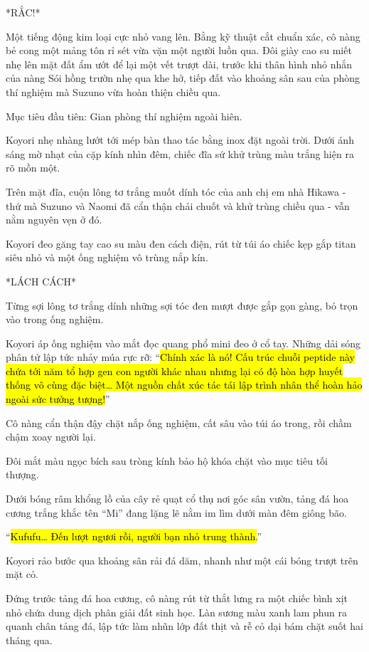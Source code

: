 \documentclass[../main.tex]{subfiles}
\begin{document}
*RẮC!*

Một tiếng động kim loại cực nhỏ vang lên. Bằng kỹ thuật cắt chuẩn xác, cô nàng bẻ cong một mảng tôn rỉ sét vừa vặn một người luồn qua. Đôi giày cao su miết nhẹ lên mặt đất ẩm ướt để lại một vết trượt dài, trước khi thân hình nhỏ nhắn của nàng Sói hồng trườn nhẹ qua khe hở, tiếp đất vào khoảng sân sau của phòng thí nghiệm mà Suzuno vừa hoàn thiện chiều qua.

Mục tiêu đầu tiên: Gian phòng thí nghiệm ngoài hiên.

Koyori nhẹ nhàng lướt tới mép bàn thao tác bằng inox đặt ngoài trời. Dưới ánh sáng mờ nhạt của cặp kính nhìn đêm, chiếc đĩa sứ khử trùng màu trắng hiện ra rõ mồn một.

Trên mặt đĩa, cuộn lông tơ trắng muốt dính tóc của anh chị em nhà Hikawa - thứ mà Suzuno và Naomi đã cẩn thận chải chuốt và khử trùng chiều qua - vẫn nằm nguyên vẹn ở đó.

Koyori đeo găng tay cao su màu đen cách điện, rút từ túi áo chiếc kẹp gắp titan siêu nhỏ và một ống nghiệm vô trùng nắp kín.

*LÁCH CÁCH*

Từng sợi lông tơ trắng dính những sợi tóc đen mượt được gắp gọn gàng, bỏ trọn vào trong ống nghiệm.

Koyori áp ống nghiệm vào mắt đọc quang phổ mini đeo ở cổ tay. Những dải sóng phân tử lập tức nhảy múa rực rỡ: ``\hl{Chính xác là nó! Cấu trúc chuỗi peptide này chứa tới năm tổ hợp gen con người khác nhau nhưng lại có độ hòa hợp huyết thống vô cùng đặc biệt\dots{} Một nguồn chất xúc tác tái lập trình nhân thể hoàn hảo ngoài sức tưởng tượng!}''

Cô nàng cẩn thận đậy chặt nắp ống nghiệm, cất sâu vào túi áo trong, rồi chầm chậm xoay người lại.

Đôi mắt màu ngọc bích sau tròng kính bảo hộ khóa chặt vào mục tiêu tối thượng.

Dưới bóng râm khổng lồ của cây rẻ quạt cổ thụ nơi góc sân vườn, tảng đá hoa cương trắng khắc tên ``Mi'' đang lặng lẽ nằm im lìm dưới màn đêm giông bão.

``\hl{Kufufu\dots{} Đến lượt ngươi rồi, người bạn nhỏ trung thành.}''

Koyori rảo bước qua khoảng sân rải đá dăm, nhanh như một cái bóng trượt trên mặt cỏ.

Đứng trước tảng đá hoa cương, cô nàng rút từ thắt lưng ra một chiếc bình xịt nhỏ chứa dung dịch phân giải đất sinh học. Làn sương màu xanh lam phun ra quanh chân tảng đá, lập tức làm nhũn lớp đất thịt và rễ cỏ dại bám chặt suốt hai tháng qua.
\end{document}
